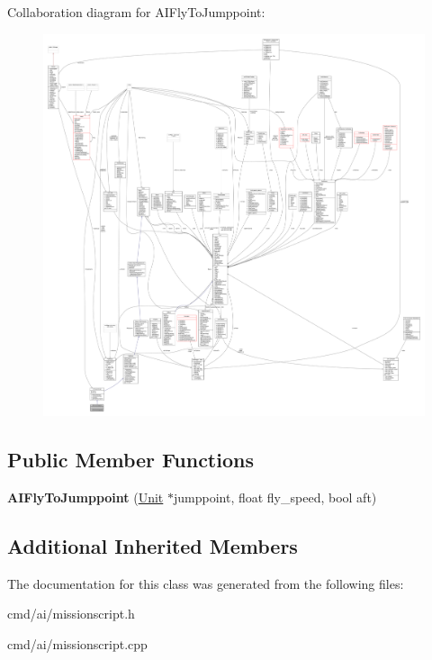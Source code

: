 Collaboration diagram for A\+I\+Fly\+To\+Jumppoint\+:
\nopagebreak
\begin{figure}[H]
\begin{center}
\leavevmode
\includegraphics[width=350pt]{d4/ded/classAIFlyToJumppoint__coll__graph}
\end{center}
\end{figure}
\subsection*{Public Member Functions}
\begin{DoxyCompactItemize}
\item 
{\bfseries A\+I\+Fly\+To\+Jumppoint} (\hyperlink{classUnit}{Unit} $\ast$jumppoint, float fly\+\_\+speed, bool aft)\hypertarget{classAIFlyToJumppoint_a81cd1bf9c66fc16fed72e62a7e0e767d}{}\label{classAIFlyToJumppoint_a81cd1bf9c66fc16fed72e62a7e0e767d}

\end{DoxyCompactItemize}
\subsection*{Additional Inherited Members}


The documentation for this class was generated from the following files\+:\begin{DoxyCompactItemize}
\item 
cmd/ai/missionscript.\+h\item 
cmd/ai/missionscript.\+cpp\end{DoxyCompactItemize}
